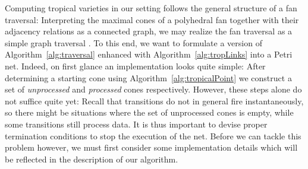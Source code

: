 \documentclass[
  paper=a4,
  titlepage,
  bibliography=totoc,
  pagesize=pdftex
]{scrartcl}
\numberwithin{figure}{section}
\numberwithin{equation}{section}
\numberwithin{table}{section}
\theoremstyle{definition}
\numberwithin{definition}{section}
\begin{document}
Computing tropical varieties in our setting follows the general structure of a fan
traversal: Interpreting the maximal cones of a polyhedral fan together with their
adjacency relations as a connected graph, we may realize the fan traversal as a simple
graph traversal \cite{JenTravSym}. To this end, we want to formulate a version of
Algorithm~\ref{alg:traversal} enhanced with Algorithm~\ref{alg:tropLinks} into a Petri
net. Indeed, on first glance an implementation looks quite simple: After determining a
starting cone using Algorithm~\ref{alg:tropicalPoint} we construct a set of
\emph{unprocessed} and \emph{processed} cones respectively. However, these steps alone do
not suffice quite yet: Recall that transitions do not in general fire instantaneously, so
there might be situations where the set of unprocessed cones is empty, while some
transitions still process data. It is thus important to devise proper termination
conditions to stop the execution of the net. Before we can tackle this problem however, we
must first consider some implementation details which will be reflected in the
description of our algorithm.
\end{document}
